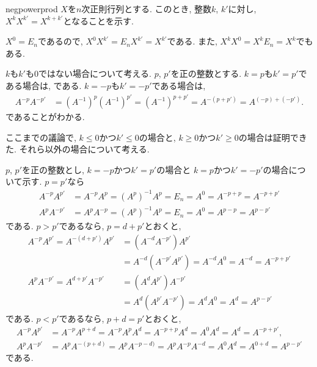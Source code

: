   
\begin{proofof*}{negpower}{prod}
  $X$を$n$次正則行列とする.
  このとき, 整数$k$, $k'$に対し, $X^{k}X^{k'}=X^{k+k'}$となることを示す.
  
  $X^{0}=E_n$であるので,
  $X^{0}X^{k'}=E_nX^{k'}=X^{k'}$である.
  また,
  $X^{k}X^{0}=X^{k}E_n=X^{k}$でもある.

  
  $k$も$k'$も$0$ではない場合について考える.
  $p$, $p'$を正の整数とする.
  $k=p$も$k'=p'$である場合は,
  である.
  $k=-p$も$k'=-p'$である場合は,
  \begin{align*}
    A^{-p}A^{-p'}&=(A^{-1})^{p}(A^{-1})^{p'}=(A^{-1})^{p+p'}=A^{-(p+p')}=A^{(-p)+(-p')}.
  \end{align*}
  であることがわかる.

  ここまでの議論で,
  $k\leq 0$かつ$k'\leq 0$の場合と,
  $k\geq 0$かつ$k'\geq 0$の場合は証明できた.  
  それら以外の場合について考える.

  
  $p$, $p'$を正の整数とし,
  $k=-p$かつ$k'=p'$の場合と
  $k=p$かつ$k'=-p'$の場合について示す.
  $p=p'$なら
  \begin{align*}
    A^{-p}A^{p'}&=A^{-p}A^{p}=(A^{p})^{-1}A^{p}=E_n=A^{0}=A^{-p+p}=A^{-p+p'}\\
    A^{p}A^{-p'}&=A^{p}A^{-p}=(A^{p})^{-1}A^{p}=E_n=A^{0}=A^{p-p}=A^{p-p'}
  \end{align*}
  である.
  $p>p'$であるなら, $p=d+p'$とおくと,
  \begin{align*}
    A^{-p}A^{p'}=A^{-(d+p')}A^{p'}
    &=(A^{-d}A^{-p'})A^{p'}\\
    &=A^{-d}(A^{-p'}A^{p'})=A^{-d}A^{0}=A^{-d}=A^{-p+p'}\\
    A^{p}A^{-p'}=A^{d+p'}A^{-p'}
    &=(A^{d}A^{p'})A^{-p'}\\
    &=A^{d}(A^{p'}A^{-p'})=A^{d}A^{0}=A^{d}=A^{p-p'}
  \end{align*}
  である.
  $p<p'$であるなら, $p+d=p'$とおくと,
  \begin{align*}
    A^{-p}A^{p'}&=A^{-p}A^{p+d}
    =A^{-p}A^{p}A^{d}=A^{-p+p}A^{d}=A^{0}A^{d}=A^{d}=A^{-p+p'},\\ 
    A^{p}A^{-p'}&=A^{p}A^{-(p+d)}=A^{p}A^{-p-d)}=A^{p}A^{-p}A^{-d}=A^{0}A^{d}=A^{0+d}=A^{p-p'}
 \end{align*}
  である.

\end{proofof*}



